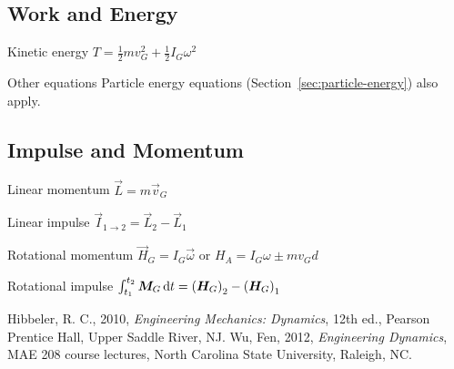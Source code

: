 \documentclass{article}
\begin{document}
\subsection{Work and Energy}
\label{sec:rigid-body-energy}

\begin{description*}
\item[Kinetic energy]
  \(T = \frac12 m v_G^2 + \frac12 I_G \omega^2\)
\item[Other equations] Particle energy equations (Section~\ref{sec:particle-energy}) also apply.
\end{description*}

\subsection{Impulse and Momentum}
\label{sec:rigid-body-momentum}

\begin{description*}
\item[Linear momentum]
  \(\vec{L} = m\vec{v}_G\)
\item[Linear impulse]
  \(\vec{I}_{1\rightarrow2} = \vec{L}_2 - \vec{L}_1\)
\item[Rotational momentum]
  \(\vec{H}_G = I_G \vec{\omega}\) or
  \(H_A = I_G \omega \pm m v_G d\)
\item[Rotational impulse]
  \(\int_{t_1}^{t_2}\vec{M}_G\dif{t} = {(\vec{H}_G)}_2 - {(\vec{H}_G)}_1\)
\end{description*}

\begin{thebibliography}{99}
 Hibbeler, R. C., 2010, \emph{Engineering Mechanics: Dynamics}, 12th ed.,
  Pearson Prentice Hall, Upper Saddle River, NJ.
 Wu, Fen, 2012, \emph{Engineering Dynamics}, MAE 208 course lectures, North Carolina
  State University, Raleigh, NC.
\end{thebibliography}
\end{document}
